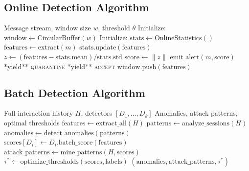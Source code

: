 \documentclass[
]{article}
\begin{document}
\subsection{Online Detection
Algorithm}\label{online-detection-algorithm}

\begin{algorithm}
\caption{Online Detection Loop}
\label{alg:online-detection}
\begin{algorithmic}[1]
\Require Message stream, window size $w$, threshold $\theta$
\State Initialize: $\text{window} \gets \text{CircularBuffer}(w)$
\State Initialize: $\text{stats} \gets \text{OnlineStatistics}()$
\Loop {}
    \State $\text{features} \gets \text{extract}(m)$
    \State $\text{stats}.\text{update}(\text{features})$
    \State $z \gets (\text{features} - \text{stats}.\text{mean}) / \text{stats}.\text{std}$
    \State $\text{score} \gets \|z\|$
        \State $\text{emit\_alert}(m, \text{score})$
        \State **yield** \textsc{quarantine}
    \Else
        \State **yield** \textsc{accept}
    \EndIf
    \State $\text{window}.\text{push}(\text{features})$
\EndLoop
\end{algorithmic}
\end{algorithm}

\subsection{Batch Detection Algorithm}\label{batch-detection-algorithm}

\begin{algorithm}
\caption{Batch Detection Analysis}
\label{alg:batch-detection}
\begin{algorithmic}[1]
\Require Full interaction history $H$, detectors $[D_1, \ldots, D_k]$
\Ensure Anomalies, attack patterns, optimal thresholds
\State $\text{features} \gets \text{extract\_all}(H)$
\State $\text{patterns} \gets \text{analyze\_sessions}(H)$
\State $\text{anomalies} \gets \text{detect\_anomalies}(\text{patterns})$
    \State $\text{scores}[D_i] \gets D_i.\text{batch\_score}(\text{features})$
\EndFor
\State $\text{attack\_patterns} \gets \text{mine\_patterns}(H, \text{scores})$
\State $\tau^* \gets \text{optimize\_thresholds}(\text{scores}, \text{labels})$
\State \Return $(\text{anomalies}, \text{attack\_patterns}, \tau^*)$
\end{algorithmic}
\end{algorithm}
\end{document}
